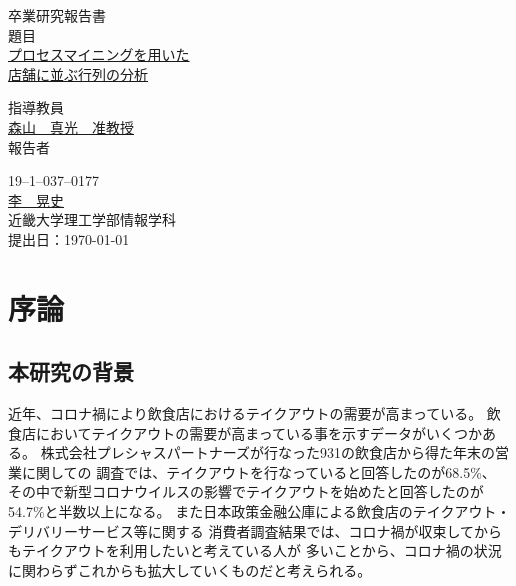 \documentclass{jsarticle}
\begin{document}
 
\begin{center}
\vspace*{1cm}
\large
{\LARGE 卒業研究報告書}\\
\vspace*{0.8cm}
題目\\
\vspace*{1cm}
{\Huge \underline{プロセスマイニングを用いた} \\ \underline{店舗に並ぶ行列の分析}}
\vspace{3mm}
 
\vspace*{3cm}
指導教員\\
\vspace*{0.3cm}
\underline{\LARGE 森山　真光　准教授}\\
\vspace*{3cm}
報告者\\
\vspace*{0.3cm}
 
{19--1--037--0177}\\
\vspace*{0.3cm}
\underline{\Huge 李　晃史}\\
\vspace*{0.5cm}
近畿大学理工学部情報学科\\
\vspace*{2cm}
提出日：\today 
\end{center}
 
\newpage
\normalsize

\tableofcontents



\newpage

\section{序論}
\subsection{本研究の背景}
近年、コロナ禍により飲食店におけるテイクアウトの需要が高まっている。
飲食店においてテイクアウトの需要が高まっている事を示すデータがいくつかある。
株式会社プレシャスパートナーズが行なった931の飲食店から得た年末の営業に関しての
調査\cite{bibi6}では、テイクアウトを行なっていると回答したのが68.5\%、
その中で新型コロナウイルスの影響でテイクアウトを始めたと回答したのが54.7\%と半数以上になる。
また日本政策金融公庫による飲食店のテイクアウト・デリバリーサービス等に関する
消費者調査結果\cite{bibi7}では、コロナ禍が収束してからもテイクアウトを利用したいと考えている人が
多いことから、コロナ禍の状況に関わらずこれからも拡大していくものだと考えられる。
\end{document}

